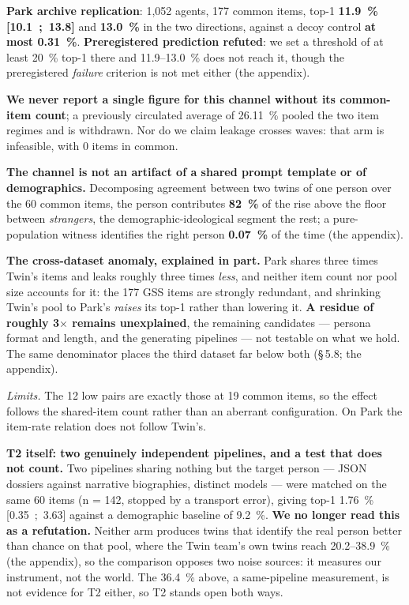 \documentclass[sigconf,anonymous,review]{acmart}
\begin{document}
\textbf{Park archive replication}: 1,052 agents, 177 common items, top-1 \textbf{11.9~\% [10.1~;~13.8]} and \textbf{13.0~\%} in the two directions, against a decoy control \textbf{at most 0.31~\%}. \textbf{Preregistered prediction refuted}: we set a threshold of at least 20~\% top-1 there and 11.9--13.0~\% does not reach it, though the preregistered \textit{failure} criterion is not met either (the appendix).

\textbf{We never report a single figure for this channel without its common-item count}; a previously circulated average of 26.11~\% pooled the two item regimes and is withdrawn. Nor do we claim leakage crosses waves: that arm is infeasible, with 0 items in common.

\textbf{The channel is not an artifact of a shared prompt template or of demographics.} Decomposing agreement between two twins of one person over the 60 common items, the person contributes \textbf{82~\%} of the rise above the floor between \textit{strangers}, the demographic-ideological segment the rest; a pure-population witness identifies the right person \textbf{0.07~\%} of the time (the appendix).

\textbf{The cross-dataset anomaly, explained in part.} Park shares three times Twin's items and leaks roughly three times \textit{less}, and neither item count nor pool size accounts for it: the 177 GSS items are strongly redundant, and shrinking Twin's pool to Park's \textit{raises} its top-1 rather than lowering it. \textbf{A residue of roughly 3$\times$ remains unexplained}, the remaining candidates --- persona format and length, and the generating pipelines --- not testable on what we hold. The same denominator places the third dataset far below both (\S\,5.8; the appendix).

\textit{Limits.} The 12 low pairs are exactly those at 19 common items, so the effect follows the shared-item count rather than an aberrant configuration. On Park the item-rate relation does not follow Twin's.

\textbf{T2 itself: two genuinely independent pipelines, and a test that does not count.} Two pipelines sharing nothing but the target person --- JSON dossiers against narrative biographies, distinct models --- were matched on the same 60 items (n = 142, stopped by a transport error), giving top-1 1.76~\% [0.35~;~3.63] against a demographic baseline of 9.2~\%. \textbf{We no longer read this as a refutation.} Neither arm produces twins that identify the real person better than chance on that pool, where the Twin team's own twins reach 20.2--38.9~\% (the appendix), so the comparison opposes two noise sources: it measures our instrument, not the world. The 36.4~\% above, a same-pipeline measurement, is not evidence for T2 either, so T2 stands open both ways.
\end{document}
